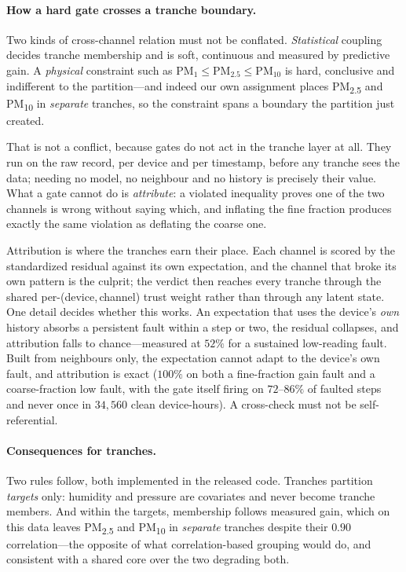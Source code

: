 \documentclass[10pt]{article}
\begin{document}
\paragraph{How a hard gate crosses a tranche boundary.}
Two kinds of cross-channel relation must not be conflated. \emph{Statistical}
coupling decides tranche membership and is soft, continuous and measured by
predictive gain. A \emph{physical} constraint such as
$\text{PM}_{1}\!\le\!\text{PM}_{2.5}\!\le\!\text{PM}_{10}$ is hard, conclusive and
indifferent to the partition---and indeed our own assignment places
PM\textsubscript{2.5} and PM\textsubscript{10} in \emph{separate} tranches, so the
constraint spans a boundary the partition just created.

That is not a conflict, because gates do not act in the tranche layer at all. They
run on the raw record, per device and per timestamp, before any tranche sees the
data; needing no model, no neighbour and no history is precisely their value. What
a gate cannot do is \emph{attribute}: a violated inequality proves one of the two
channels is wrong without saying which, and inflating the fine fraction produces
exactly the same violation as deflating the coarse one.

Attribution is where the tranches earn their place. Each channel is scored by the
standardized residual against its own expectation, and the channel that broke its
own pattern is the culprit; the verdict then reaches every tranche through the
shared per-(device,\,channel) trust weight rather than through any latent state.
One detail decides whether this works. An expectation that uses the device's
\emph{own} history absorbs a persistent fault within a step or two, the residual
collapses, and attribution falls to chance---measured at $52\%$ for a sustained
low-reading fault. Built from neighbours only, the expectation cannot adapt to the
device's own fault, and attribution is exact ($100\%$ on both a fine-fraction gain
fault and a coarse-fraction low fault, with the gate itself firing on $72$--$86\%$
of faulted steps and never once in $34{,}560$ clean device-hours). A cross-check
must not be self-referential.

\paragraph{Consequences for tranches.}
Two rules follow, both implemented in the released code. Tranches partition
\emph{targets} only: humidity and pressure are covariates and never become tranche
members. And within the targets, membership follows measured gain, which on this
data leaves PM\textsubscript{2.5} and PM\textsubscript{10} in \emph{separate}
tranches despite their $0.90$ correlation---the opposite of what correlation-based
grouping would do, and consistent with a shared core over the two degrading both.
\end{document}
